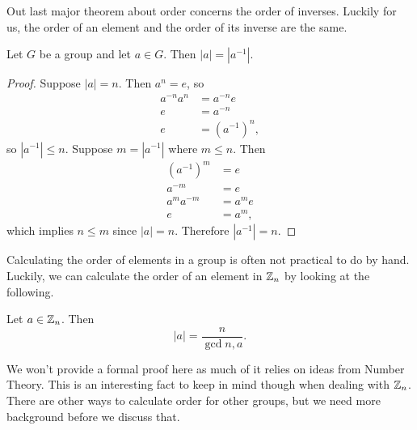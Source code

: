 Out last major theorem about order concerns the order of inverses. Luckily for us, the order of an element and the order of its inverse are the same.

\begin{theorem}{}
    Let $G$ be a group and let $a\in G$. Then $|a|=|a^{-1}|$.
\end{theorem}
\begin{proof}
    Suppose $|a|=n$. Then $a^{n}=e$, so
    \begin{align*}
        a^{-n}a^{n}&=a^{-n}e\\
        e&=a^{-n}\\
        e &= (a^{-1})^{n},
    \end{align*}
    so $|a^{-1}|\leq n$.
    Suppose $m=|a^{-1}|$ where $m\leq n$. Then
    \begin{align*}
        (a^{-1})^{m}&=e\\
        a^{-m}&= e\\
        a^{m}a^{-m}&=a^{m}e\\
        e &= a^{m},
    \end{align*}
    which implies $n\leq m$ since $|a|=n$. Therefore $|a^{-1}|=n$.
\end{proof}

Calculating the order of elements in a group is often not practical to do by hand. Luckily, we can calculate the order of an element in $\mathbb{Z}_{n}$ by looking at the following.

\begin{theorem}{}
    Let $a\in\mathbb{Z}_{n}$. Then
    \[
        |a|=\frac{n}{\gcd{n,a}}.
    \]
\end{theorem}
We won't provide a formal proof here as much of it relies on ideas from Number Theory. This is an interesting fact to keep in mind though when dealing with $\mathbb{Z}_{n}$. There are other ways to calculate order for other groups, but we need more background before we discuss that.
